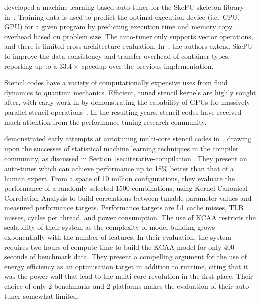 \citeauthor{Dastgeer2011} developed a machine learning based auto-tuner
for the SkePU skeleton library in~\cite{Dastgeer2011}. Training data
is used to predict the optimal execution device (i.e.\ CPU, GPU) for a
given program by predicting execution time and memory copy overhead
based on problem size. The auto-tuner only supports vector operations,
and there is limited cross-architecture
evaluation. In~\cite{Dastgeer2015a}, the authors extend SkePU to
improve the data consistency and transfer overhead of container types,
reporting up to a $33.4\times$ speedup over the previous
implementation.



Stencil codes have a variety of computationally expensive uses from
fluid dynamics to quantum mechanics. Efficient, tuned stencil kernels
are highly sought after, with early work in \citeyear{Bolz2003} by
\citeauthor{Bolz2003} demonstrating the capability of GPUs for
massively parallel stencil operations~\cite{Bolz2003}. In the
resulting years, stencil codes have received much attention from the
performance tuning research community.

\citeauthor{Ganapathi2009} demonstrated early attempts at autotuning
multi-core stencil codes in~\cite{Ganapathi2009}, drawing upon the
successes of statistical machine learning techniques in the compiler
community, as discussed in
Section~\ref{sec:iterative-compilation}. They present an auto-tuner
which can achieve performance up to 18\% better than that of a human
expert. From a space of 10 million configurations, they evaluate the
performance of a randomly selected 1500 combinations, using Kernel
Canonical Correlation Analysis to build correlations between tunable
parameter values and measured performance targets. Performance targets
are L1 cache misses, TLB misses, cycles per thread, and power
consumption. The use of KCAA restricts the scalability of their system
as the complexity of model building grows exponentially with the
number of features. In their evaluation, the system requires two hours
of compute time to build the KCAA model for only 400 seconds of
benchmark data. They present a compelling argument for the use of
energy efficiency as an optimisation target in addition to runtime,
citing that it was the power wall that lead to the multi-core
revolution in the first place. Their choice of only 2 benchmarks and 2
platforms makes the evaluation of their auto-tuner somewhat limited.

